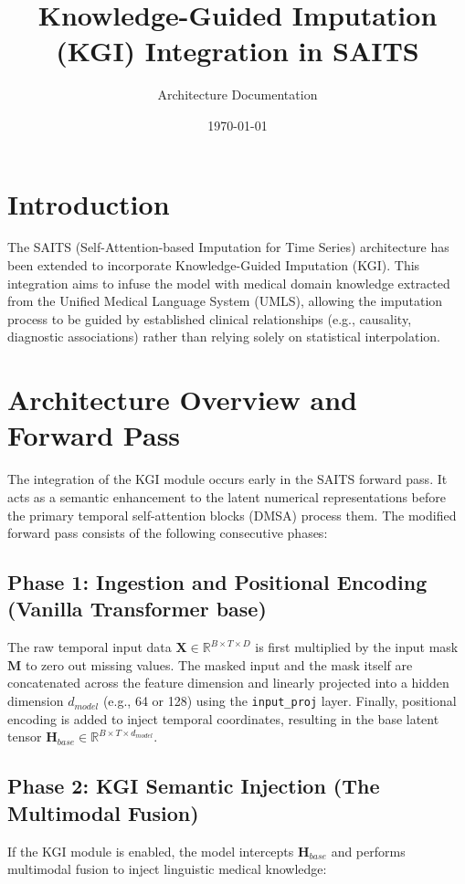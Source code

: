 \documentclass{article}
\title{Knowledge-Guided Imputation (KGI) Integration in SAITS}
\author{Architecture Documentation}
\date{\today}
\begin{document}
\maketitle

\section{Introduction}
The SAITS (Self-Attention-based Imputation for Time Series) architecture has been extended to incorporate Knowledge-Guided Imputation (KGI). This integration aims to infuse the model with medical domain knowledge extracted from the Unified Medical Language System (UMLS), allowing the imputation process to be guided by established clinical relationships (e.g., causality, diagnostic associations) rather than relying solely on statistical interpolation.

\section{Architecture Overview and Forward Pass}
The integration of the KGI module occurs early in the SAITS forward pass. It acts as a semantic enhancement to the latent numerical representations before the primary temporal self-attention blocks (DMSA) process them. The modified forward pass consists of the following consecutive phases:

\subsection{Phase 1: Ingestion and Positional Encoding (Vanilla Transformer base)}
The raw temporal input data $\mathbf{X} \in \mathbb{R}^{B \times T \times D}$ is first multiplied by the input mask $\mathbf{M}$ to zero out missing values. The masked input and the mask itself are concatenated across the feature dimension and linearly projected into a hidden dimension $d_{model}$ (e.g., 64 or 128) using the \texttt{input\_proj} layer. Finally, positional encoding is added to inject temporal coordinates, resulting in the base latent tensor $\mathbf{H}_{base} \in \mathbb{R}^{B \times T \times d_{model}}$.

\subsection{Phase 2: KGI Semantic Injection (The Multimodal Fusion)}
If the KGI module is enabled, the model intercepts $\mathbf{H}_{base}$ and performs multimodal fusion to inject linguistic medical knowledge:
\end{document}
